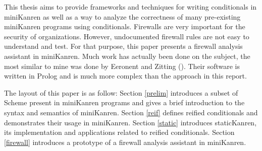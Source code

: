 \ifthesis This thesis aims to provide frameworks and techniques for writing conditionals in miniKanren as well as a way to analyze the correctness of many pre-existing miniKanren programs using conditionals.
\else Firewalls are very important for the security of organizations. However, undocumented firewall rules are not easy to understand and test. For that purpose, this paper presents a firewall analysis assistant in miniKanren. Much work has actually been done on the subject, the most similar to mine was done by Eeronent and Zitting (\cite{Eronen2001AnES}). Their software is written in Prolog and is much more complex than the approach in this report.\fi

The layout of this paper is as follow: Section \ref{prelim} introduces a subset of Scheme present in miniKanren programs and gives a brief introduction to the syntax and semantics of miniKanren.
\ifthesis Section \ref{reif} defines reified conditionals and demonstrates their usage in miniKanren. Section \ref{static} introduces staticKanren, its implementation and applications related to reified conditionals.
\else Section \ref{firewall} introduces a prototype of a firewall analysis assistant in miniKanren.\fi